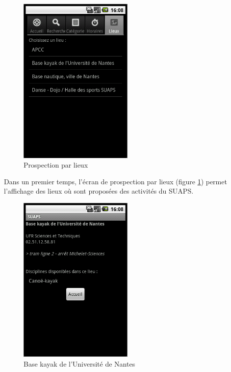 \documentclass[french, titlepage, 11pt, a4paper]{article}
\begin{document}
	\begin{figure}[ht]
		\centering
		\includegraphics[width=0.5\textwidth]{lieux.png}
		\caption{Prospection par lieux}
		\label{fig:lieux}
	\end{figure}

	Dans un premier temps, l'écran de prospection par lieux (figure
	\ref{fig:lieux}) permet l'affichage des lieux où sont proposées des
	activités du SUAPS.

	\begin{figure}[ht]
		\centering
		\includegraphics[width=0.5\textwidth]{basekayak.png}
		\caption{Base kayak de l'Université de Nantes}
		\label{fig:basekayak}
	\end{figure}
\end{document}

